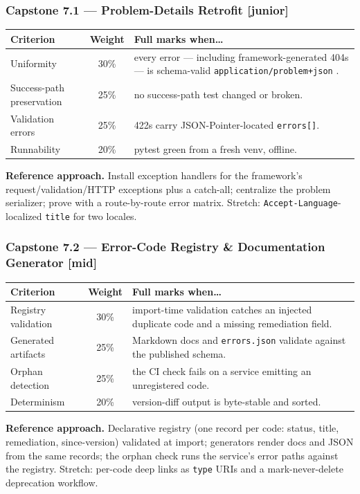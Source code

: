 \subsubsection*{Capstone 7.1 --- Problem-Details Retrofit [junior]}
\begin{center}\small
\begin{tabularx}{\textwidth}{l c X}
\toprule
\textbf{Criterion} & \textbf{Weight} & \textbf{Full marks when\ldots} \\
\midrule
Uniformity & 30\% & every error --- including framework-generated 404s --- is schema-valid \texttt{application/problem+json} \cite{rfc9457}. \\
Success-path preservation & 25\% & no success-path test changed or broken. \\
Validation errors & 25\% & 422s carry JSON-Pointer-located \texttt{errors[]}. \\
Runnability & 20\% & pytest green from a fresh venv, offline. \\
\bottomrule
\end{tabularx}
\end{center}
\textbf{Reference approach.} Install exception handlers for the framework's
request/validation/HTTP exceptions plus a catch-all; centralize the problem
serializer; prove with a route-by-route error matrix. Stretch:
\texttt{Accept-Language}-localized \texttt{title} for two locales.

\subsubsection*{Capstone 7.2 --- Error-Code Registry \& Documentation Generator [mid]}
\begin{center}\small
\begin{tabularx}{\textwidth}{l c X}
\toprule
\textbf{Criterion} & \textbf{Weight} & \textbf{Full marks when\ldots} \\
\midrule
Registry validation & 30\% & import-time validation catches an injected duplicate code and a missing remediation field. \\
Generated artifacts & 25\% & Markdown docs and \texttt{errors.json} validate against the published schema. \\
Orphan detection & 25\% & the CI check fails on a service emitting an unregistered code. \\
Determinism & 20\% & version-diff output is byte-stable and sorted. \\
\bottomrule
\end{tabularx}
\end{center}
\textbf{Reference approach.} Declarative registry (one record per code:
status, title, remediation, since-version) validated at import; generators
render docs and JSON from the same records; the orphan check runs the
service's error paths against the registry. Stretch: per-code deep links as
\texttt{type} URIs and a mark-never-delete deprecation workflow.

